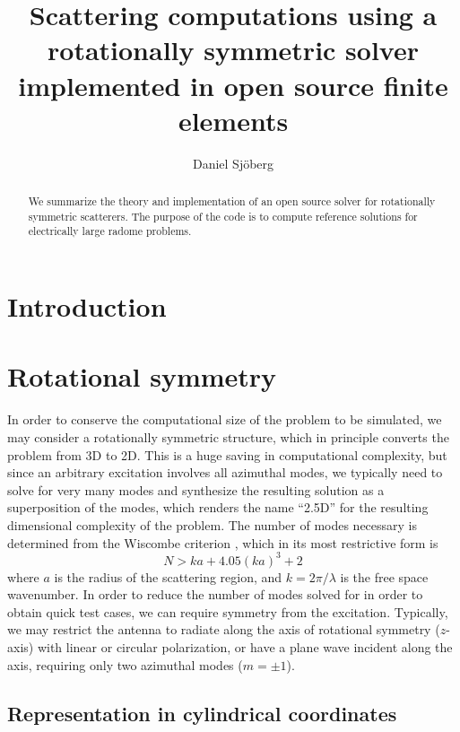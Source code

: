 \documentclass[a4paper,12pt]{article}
\title{Scattering computations using a rotationally symmetric solver
  implemented in open source finite elements}
\author{Daniel Sj\"oberg}
\begin{document}
\maketitle

\begin{abstract}
  We summarize the theory and implementation of an open source solver
  for rotationally symmetric scatterers. The purpose of the code is to
  compute reference solutions for electrically large radome problems.
\end{abstract}


\section{Introduction}



\section{Rotational symmetry}
\label{sec:rotational}

In order to conserve the computational size of the problem to be
simulated, we may consider a rotationally symmetric structure, which
in principle converts the problem from 3D to 2D. This is a huge saving
in computational complexity, but since an arbitrary excitation
involves all azimuthal modes, we typically need to solve for very many
modes and synthesize the resulting solution as a superposition of the
modes, which renders the name ``2.5D'' for the resulting dimensional
complexity of the problem. The number of modes necessary is determined
from the Wiscombe criterion \cite{Wiscombe1980}, which in its most
restrictive form is
\begin{equation}
  N > ka + 4.05(ka)^{3} + 2
\end{equation}
where $a$ is the radius of the scattering region, and
$k = 2\pi/\lambda$ is the free space wavenumber. In order to reduce
the number of modes solved for in order to obtain quick test cases, we
can require symmetry from the excitation. Typically, we may restrict
the antenna to radiate along the axis of rotational symmetry
($z$-axis) with linear or circular polarization, or have a plane wave
incident along the axis, requiring only two azimuthal modes
($m=\pm1$).


\subsection{Representation in cylindrical coordinates}
\end{document}
